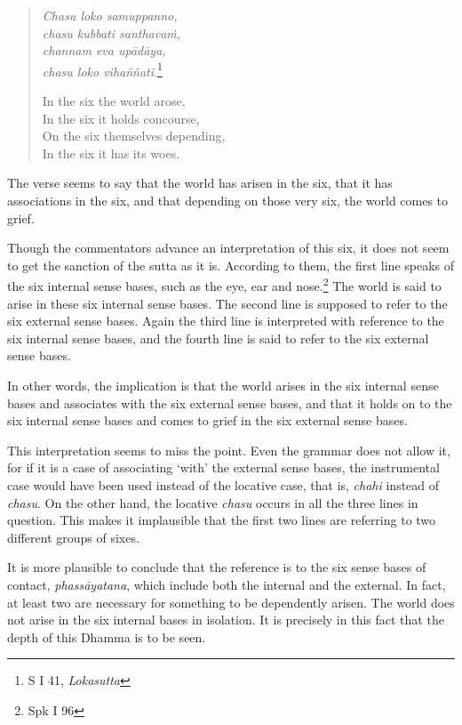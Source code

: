 \begin{quote}
\emph{Chasu loko samuppanno,}\\
\emph{chasu kubbati santhavaṁ,}\\
\emph{channam eva upādāya,}\\
\emph{chasu loko vihaññati}.\footnote{S I 41, \emph{Lokasutta}}

In the six the world arose,\\
In the six it holds concourse,\\
On the six themselves depending,\\
In the six it has its woes.
\end{quote}

The verse seems to say that the world has arisen in the six, that it has associations in the six, and that depending on those very six, the world comes to grief.

Though the commentators advance an interpretation of this six, it does not seem to get the sanction of the sutta as it is. According to them, the first line speaks of the six internal sense bases, such as the eye, ear and nose.\footnote{Spk I 96} The world is said to arise in these six internal sense bases. The second line is supposed to refer to the six external sense bases. Again the third line is interpreted with reference to the six internal sense bases, and the fourth line is said to refer to the six external sense bases.

In other words, the implication is that the world arises in the six internal sense bases and associates with the six external sense bases, and that it holds on to the six internal sense bases and comes to grief in the six external sense bases.

This interpretation seems to miss the point. Even the grammar does not allow it, for if it is a case of associating `with' the external sense bases, the instrumental case would have been used instead of the locative case, that is, \emph{chahi} instead of \emph{chasu}. On the other hand, the locative \emph{chasu} occurs in all the three lines in question. This makes it implausible that the first two lines are referring to two different groups of sixes.

It is more plausible to conclude that the reference is to the six sense bases of contact, \emph{phassāyatana}, which include both the internal and the external. In fact, at least two are necessary for something to be dependently arisen. The world does not arise in the six internal bases in isolation. It is precisely in this fact that the depth of this Dhamma is to be seen.

